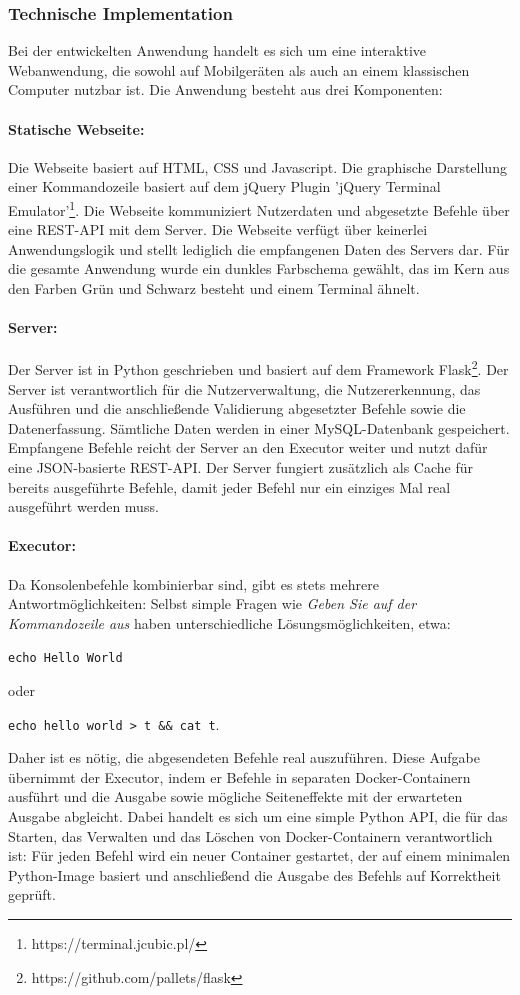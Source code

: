 \subsubsection{Technische Implementation}
Bei der entwickelten Anwendung handelt es sich um eine interaktive Webanwendung, die sowohl auf Mobilgeräten als auch an einem klassischen Computer nutzbar ist. Die Anwendung besteht aus drei Komponenten:

\paragraph{Statische Webseite:}
Die Webseite basiert auf HTML, CSS und Javascript. Die graphische Darstellung einer Kommandozeile basiert auf dem jQuery Plugin 'jQuery Terminal Emulator'\footnote{https://terminal.jcubic.pl/}. Die Webseite kommuniziert Nutzerdaten und abgesetzte Befehle über eine REST-API mit dem Server. Die Webseite verfügt über keinerlei Anwendungslogik und stellt lediglich die empfangenen Daten des Servers dar. Für die gesamte Anwendung wurde ein dunkles Farbschema gewählt, das im Kern aus den Farben Grün und Schwarz besteht und einem Terminal ähnelt.

\paragraph{Server:}
Der Server ist in Python geschrieben und basiert auf dem Framework Flask\footnote{https://github.com/pallets/flask}. Der Server ist verantwortlich für die Nutzerverwaltung, die Nutzererkennung, das Ausführen und die anschließende Validierung abgesetzter Befehle sowie die Datenerfassung. Sämtliche Daten werden in einer MySQL-Datenbank gespeichert. Empfangene Befehle reicht der Server an den Executor weiter und nutzt dafür eine JSON-basierte REST-API. Der Server fungiert zusätzlich als Cache für bereits ausgeführte Befehle, damit jeder Befehl nur ein einziges Mal real ausgeführt werden muss.

\paragraph{Executor:}

  Da Konsolenbefehle kombinierbar sind, gibt es stets mehrere Antwortmöglichkeiten: Selbst simple Fragen wie \textit{Geben Sie  auf der Kommandozeile aus} haben unterschiedliche Lösungsmöglichkeiten, etwa:
  \begin{center}
      \verb|echo Hello World|
  \end{center}
  oder 
   \begin{center}
      \verb|echo hello world > t && cat t|.
  \end{center}
  Daher ist es nötig, die abgesendeten Befehle real auszuführen. Diese Aufgabe übernimmt der Executor, indem er Befehle in separaten Docker-Containern ausführt und die Ausgabe sowie mögliche Seiteneffekte mit der erwarteten Ausgabe abgleicht. Dabei handelt es sich um eine simple Python API, die für das Starten, das Verwalten und das Löschen von Docker-Containern verantwortlich ist: Für jeden Befehl wird ein neuer Container gestartet, der auf einem minimalen Python-Image basiert und anschließend die Ausgabe des Befehls auf Korrektheit geprüft.



